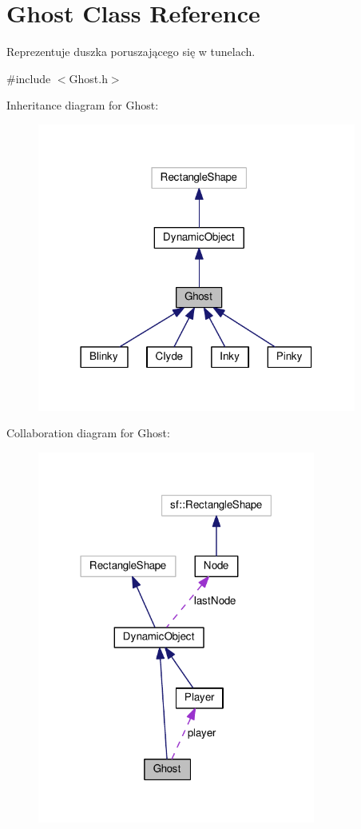 \hypertarget{classGhost}{}\section{Ghost Class Reference}
\label{classGhost}


Reprezentuje duszka poruszającego się w tunelach.  




{\ttfamily \#include $<$Ghost.\+h$>$}



Inheritance diagram for Ghost\+:\nopagebreak
\begin{figure}[H]
\begin{center}
\leavevmode
\includegraphics[width=297pt]{classGhost__inherit__graph}
\end{center}
\end{figure}


Collaboration diagram for Ghost\+:\nopagebreak
\begin{figure}[H]
\begin{center}
\leavevmode
\includegraphics[width=259pt]{classGhost__coll__graph}
\end{center}
\end{figure}
